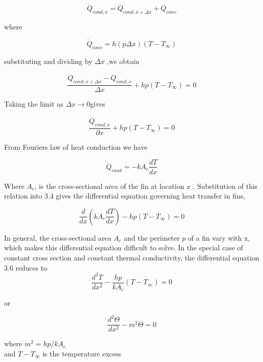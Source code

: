 \begin{equation}
\dot{Q}_{cond,x}= \dot{Q}_{cond,x + \Delta x} + \dot{Q}_{conv}
\end{equation}  

where

\begin{equation}
    \dot{Q}_{conv} = h(p \Delta x)(T - T_\infty)
\end{equation}  

substituting and dividing by $ \Delta x $ ,we obtain

\begin{equation}
\frac{\dot{Q}_{cond,x + \Delta x}-\dot{Q}_{cond,x} }{\Delta x} + h p (T - T_\infty)= 0
\end{equation}  

Taking the limit as $ \Delta x  \rightarrow 0 $gives

\begin{equation}
\frac{\dot{Q}_{cond,x} }{\partial x} + h p (T - T_\infty)= 0
\end{equation} 

From Fouriers law of heat conduction we have 

\begin{equation}
\dot{Q}_{cond}= -k A_c \dfrac{dT}{dx}
\end{equation} 

Where $ A_c$, is the cross-sectional area of the fin at location $x$ . Substitution of this relation into 3.4 gives the differential equation governing heat transfer in fins,

\begin{equation}
\frac{d}{dx}(k A_c \frac{dT}{dx}) - hp(T-T_\infty) = 0
\end{equation} 

In general, the cross-sectional area $A_c$ and the perimeter $p$ of a fin vary with x, which makes this differential equation difficult to solve. In the special case of constant cross section and constant thermal conductivity, the differential equation 3.6 reduces to
\begin{equation}
\frac{d^2 T}{d x^2} - \frac{hp}{kA_c}(T-T_\infty) = 0
\end{equation}

or

\begin{equation}
\frac{d^2 \varTheta}{d x^2} - m^2 \varTheta = 0
\end{equation}

where $m^2 = hp / kA_c$  \\
and $ T-T_\infty $ is the temperature excess
 

